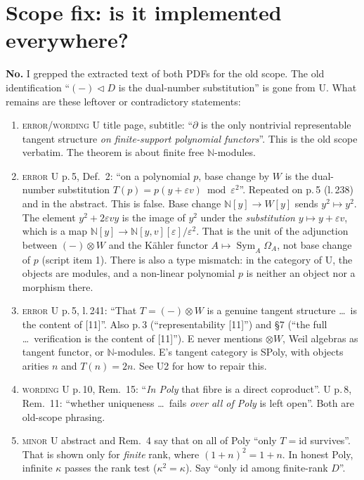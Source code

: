 \documentclass[11pt]{article}
\newcommand{\tri}{\mathbin{\triangleleft}}
\newcommand{\N}{\mathbb{N}}
\newcommand{\iss}[1]{\textsc{#1}}
\begin{document}
\section{Scope fix: is it implemented everywhere?}
\textbf{No.} I grepped the extracted text of both PDFs for the old scope. The old identification
``$(-)\tri D$ is the dual-number substitution'' is gone from U. What remains are these leftover
or contradictory statements:
\begin{enumerate}[label=\textbf{S\arabic*.},leftmargin=*]
\item \iss{error/wording} U title page, subtitle: ``$\partial$ is the only nontrivial representable
tangent structure \emph{on finite-support polynomial functors}''. This is the old scope verbatim.
The theorem is about finite free $\N$-modules.
\item \iss{error} U p.\,5, Def.~2: ``on a polynomial $p$, base change by $W$ is the dual-number
substitution $T(p)=p(y+\varepsilon v)\bmod\varepsilon^2$''. Repeated on p.\,5 (l.\,238) and in the
abstract. This is false. Base change $\N[y]\to W[y]$ sends $y^2\mapsto y^2$. The element
$y^2+2\varepsilon vy$ is the image of $y^2$ under the \emph{substitution} $y\mapsto y+\varepsilon v$,
which is a map $\N[y]\to\N[y,v][\varepsilon]/\varepsilon^2$. That is the unit of the adjunction
between $(-)\otimes W$ and the K\"ahler functor $A\mapsto\operatorname{Sym}_A\Omega_A$, not base
change of $p$ (script item 1). There is also a type mismatch: in the category of U, the objects are
modules, and a non-linear polynomial $p$ is neither an object nor a morphism there.
\item \iss{error} U p.\,5, l.\,241: ``That $T=(-)\otimes W$ is a genuine tangent structure \dots\ is
the content of [11]''. Also p.\,3 (``representability [11]'') and \S7 (``the full \dots\
verification is the content of [11]''). E never mentions $\otimes W$, Weil algebras as tangent
functor, or $\N$-modules. E's tangent category is SPoly, with objects arities $n$ and $T(n)=2n$.
See U2 for how to repair this.
\item \iss{wording} U p.\,10, Rem.~15: ``\emph{In Poly} that fibre is a direct coproduct''. U
p.\,8, Rem.~11: ``whether uniqueness \dots\ fails \emph{over all of Poly} is left open''. Both are
old-scope phrasing.
\item \iss{minor} U abstract and Rem.~4 say that on all of Poly ``only $T=\mathrm{id}$ survives''.
That is shown only for \emph{finite} rank, where $(1+n)^2=1+n$. In honest Poly, infinite $\kappa$
passes the rank test ($\kappa^2=\kappa$). Say ``only id among finite-rank $D$''.

\end{enumerate}
\end{document}
